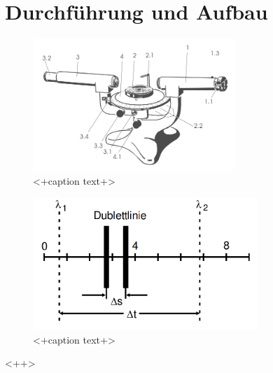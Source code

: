 \section{Durchführung und Aufbau}
\label{sec:Durchführung}

\begin{figure}
  \centering
  \includegraphics[height=5cm]{picture/Aufbau.png}
  \caption{<+caption text+>}
  \label{fig:<+label+>}
\end{figure}

\begin{figure}
  \centering
  \includegraphics[height=5cm]{picture/Duplet.png}
  \caption{<+caption text+>}
  \label{fig:<+label+>}
\end{figure}<++>
